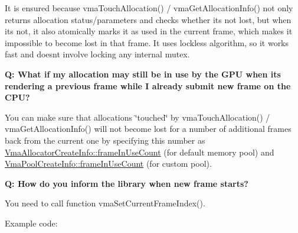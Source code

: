 It is ensured because vma\+Touch\+Allocation() / vma\+Get\+Allocation\+Info() not only returns allocation status/parameters and checks whether it\textquotesingle{}s not lost, but when it\textquotesingle{}s not, it also atomically marks it as used in the current frame, which makes it impossible to become lost in that frame. It uses lockless algorithm, so it works fast and doesn\textquotesingle{}t involve locking any internal mutex.

{\bfseries{Q\+: What if my allocation may still be in use by the GPU when it\textquotesingle{}s rendering a previous frame while I already submit new frame on the CPU?}}

You can make sure that allocations \char`\"{}touched\char`\"{} by vma\+Touch\+Allocation() / vma\+Get\+Allocation\+Info() will not become lost for a number of additional frames back from the current one by specifying this number as \mbox{\hyperlink{structVmaAllocatorCreateInfo_a21ea188dd212b8171cb9ecbed4a2a3a7}{Vma\+Allocator\+Create\+Info\+::frame\+In\+Use\+Count}} (for default memory pool) and \mbox{\hyperlink{structVmaPoolCreateInfo_a9437e43ffbb644dbbf7fc4e50cfad6aa}{Vma\+Pool\+Create\+Info\+::frame\+In\+Use\+Count}} (for custom pool).

{\bfseries{Q\+: How do you inform the library when new frame starts?}}

You need to call function vma\+Set\+Current\+Frame\+Index().

Example code\+:


